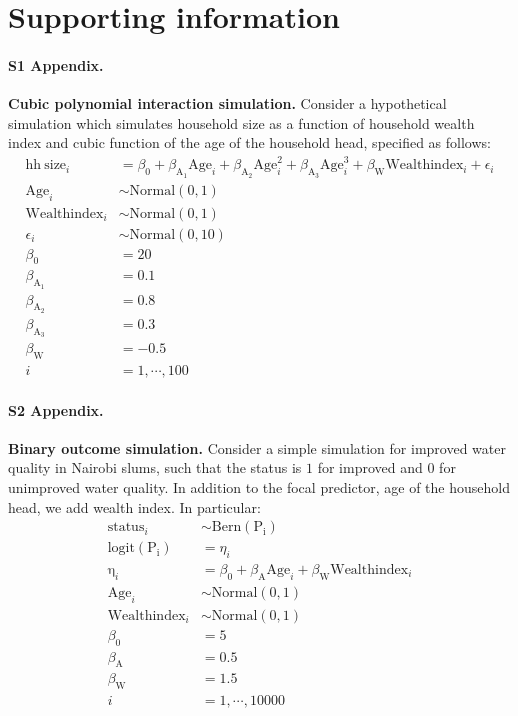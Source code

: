 \section{Supporting information}

\paragraph*{S1 Appendix.}
\label{S1_Appendix}
{\bf Cubic polynomial interaction simulation.} Consider a hypothetical simulation which simulates household size as a function of household wealth index and cubic function of the age of the household head, specified as follows:
%
\begin{align}\label{sim:lm_cubic}
\mathrm{hh~size}_i &= \beta_0 + \beta_{\mathrm{A_1}}\mathrm{Age}_i + \beta_{\mathrm{A_2}}\mathrm{Age}^2_i + \beta_{\mathrm{A_3}}\mathrm{Age}^3_i + \beta_{\mathrm{W}}\mathrm{Wealthindex}_i + \epsilon_i \nonumber\\
\mathrm{Age}_i &\sim \mathrm{Normal}(0, 1) \nonumber\\
\mathrm{Wealthindex}_i &\sim \mathrm{Normal}(0, 1) \nonumber\\
\epsilon_i &\sim \mathrm{Normal}(0, 10) \nonumber\\
\beta_0 &= 20 \nonumber\\
\beta_{\mathrm{A}_1} &= 0.1 \nonumber\\
\beta_{\mathrm{A}_2} &= 0.8 \nonumber\\
\beta_{\mathrm{A}_3} &= 0.3 \nonumber\\
\beta_{\mathrm{W}} &= -0.5 \nonumber\\
i &= 1,\cdots, 100
\end{align}


\paragraph*{S2 Appendix.}
\label{S2_Appendix}
{\bf Binary outcome simulation.} Consider a simple simulation for improved water quality in Nairobi slums, such that the status is $1$ for improved and $0$ for unimproved water quality. In addition to the focal predictor, age of the household head, we add wealth index. In particular:
%
\begin{align}\label{sim:glm_two_pred}
\mathrm{status}_i &\sim \mathrm{Bern}(\mathrm{P_i}) \nonumber\\
\mathrm{logit}(\mathrm{P_i}) &= \eta_i \nonumber\\
\mathrm{\eta}_i &= \beta_0 + \beta_{\mathrm{A}}\mathrm{Age}_i + \beta_{\mathrm{W}}\mathrm{Wealthindex}_i \nonumber\\
\mathrm{Age}_i &\sim \mathrm{Normal}(0, 1) \nonumber\\
\mathrm{Wealthindex}_i &\sim \mathrm{Normal}(0, 1) \nonumber\\
\beta_0 &= 5 \nonumber\\
\beta_{\mathrm{A}} &= 0.5 \nonumber\\
\beta_{\mathrm{W}} &= 1.5 \nonumber\\
i &= 1,\cdots, 10000
\end{align}


